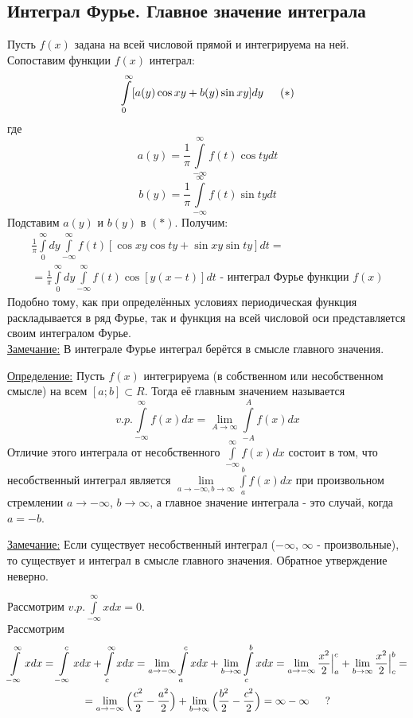\documentclass[12pt]{article}
\let\oldint\int
\let\oldlim\lim
\renewcommand{\int}{\oldint\limits}
\renewcommand{\lim}{\oldlim\limits}
\begin{document}
    \subsection{Интеграл Фурье. Главное значение интеграла}
    Пусть $f(x)$ задана на всей числовой прямой и интегрируема на ней. Сопоставим функции $f(x)$ интеграл:
    \[ \int_{0}^{\infty} [ a(y) \cos xy + b(y) \sin xy ]dy \indent (*) \]
    где
    \[ a(y) = \frac{1}{\pi}\int_{-\infty}^{\infty}f(t)\cos ty dt \]
    \[ b(y) = \frac{1}{\pi}\int_{-\infty}^{\infty}f(t)\sin ty dt\]
    Подставим $a(y)$ и $b(y)$ в $(*)$. Получим:
    \begin{gather*}
      \frac{1}{\pi} \int_{0}^{\infty} dy \int_{-\infty}^{\infty} f(t) [ \cos xy \cos ty + \sin xy \sin ty ] dt =\\
      = \frac{1}{\pi} \int_{0}^{\infty} dy \int_{-\infty}^{\infty} f(t) \cos [ y(x-t) ] dt \text{ - интеграл Фурье функции } f(x)
    \end{gather*}
    Подобно тому, как при определённых условиях периодическая функция раскладывается в ряд Фурье, так и функция на всей числовой оси представляется своим интегралом Фурье.\\
    \underline{Замечание:} В интеграле Фурье интеграл берётся в смысле главного значения.\par\noindent
    \underline{Определение:} Пусть $f(x)$ интегрируема (в собственном или несобственном смысле) на всем $[a; b] \subset R$. Тогда её главным значением называется 
    \[ v.p. \int_{-\infty}^{\infty} f(x) dx = \lim_{A \to \infty} \int_{-A}^{A} f(x)dx \]
    Отличие этого интеграла от несобственного $\int_{-\infty}^{\infty} f(x)dx$ состоит в том, что несобственный интеграл является $\lim_{a \to -\infty, b \to \infty} \int_{a}^{b} f(x)dx$ при произвольном стремлении $a \to -\infty$, $b \to \infty$, а главное значение интеграла - это случай, когда $a = -b$.\par\noindent
    \underline{Замечание:} Если существует несобственный интеграл ($-\infty$, $\infty$ - произвольные), то существует и интеграл в смысле главного значения. Обратное утверждение неверно.
    \begin{adjustwidth}{1.5em}{1.5em}
      Рассмотрим $v. p. \int_{-\infty}^{\infty} xdx = 0$.\\
      Рассмотрим 
      \begin{gather*}
          \int_{-\infty}^{\infty} xdx = \int_{-\infty}^{c} xdx + \int_{c}^{\infty} xdx = \lim_{a \to -\infty} \int_{a}^{c} xdx + \lim_{b \to \infty} \int_{c}^{b} xdx = \lim_{a \to -\infty}\frac{x^2}{2}\Big|^c_a + \lim_{b\to\infty}\frac{x^2}{2}\Big|^b_c =\\
          = \lim_{a\to -\infty} \Big( \frac{c^2}{2} - \frac{a^2}{2} \Big) + \lim_{b \to \infty} \Big( \frac{b^2}{2} - \frac{c^2}{2} \Big) = \infty - \infty \indent ?
      \end{gather*}
    \end{adjustwidth}
    
\end{document}
